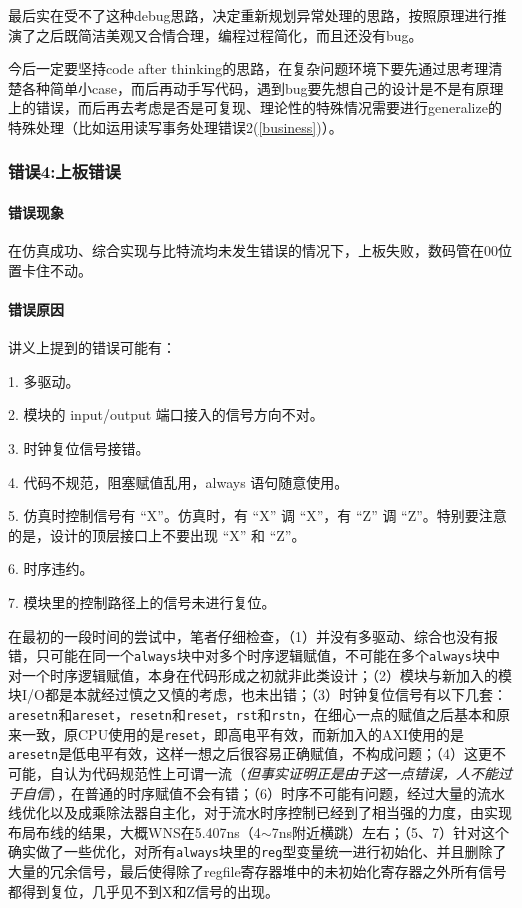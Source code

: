 \documentclass[UTF-8,twoside,c5size]{ctexart}
\begin{document}
	最后实在受不了这种debug思路，决定重新规划异常处理的思路，按照原理进行推演了之后既简洁美观又合情合理，编程过程简化，而且还没有bug。
	
	今后一定要坚持code after thinking的思路，在复杂问题环境下要先通过思考理清楚各种简单小case，而后再动手写代码，遇到bug要先想自己的设计是不是有原理上的错误，而后再去考虑是否是可复现、理论性的特殊情况需要进行generalize的特殊处理（比如运用读写事务处理错误2(\ref{business})）。
    	
   	\subsubsection{错误\textbf{4:}上板错误}
    	
    \paragraph{错误现象}\hfill
    
    在仿真成功、综合实现与比特流均未发生错误的情况下，上板失败，数码管在00位置卡住不动。
    
    \paragraph{错误原因}\hfill
    
    讲义上提到的错误可能有：
    
    1. 多驱动。
    
    2. 模块的 input/output 端口接入的信号方向不对。
    
    3. 时钟复位信号接错。
    
    4. 代码不规范，阻塞赋值乱用，always 语句随意使用。
    
    5. 仿真时控制信号有 “X”。仿真时，有 “X” 调 “X”，有 “Z” 调 “Z”。特别要注意的是，设计的顶层接口上不要出现 “X” 和 “Z”。
    
    6. 时序违约。
    
    7. 模块里的控制路径上的信号未进行复位。
    
    在最初的一段时间的尝试中，笔者仔细检查，（1）并没有多驱动、综合也没有报错，只可能在同一个\texttt{always}块中对多个时序逻辑赋值，不可能在多个\texttt{always}块中对一个时序逻辑赋值，本身在代码形成之初就非此类设计；（2）模块与新加入的模块I/O都是本就经过慎之又慎的考虑，也未出错；（3）时钟复位信号有以下几套：\texttt{aresetn}和\texttt{areset}，\texttt{resetn}和\texttt{reset}，\texttt{rst}和\texttt{rstn}，在细心一点的赋值之后基本和原来一致，原CPU使用的是\texttt{reset}，即高电平有效，而新加入的AXI使用的是\texttt{aresetn}是低电平有效，这样一想之后很容易正确赋值，不构成问题；（4）这更不可能，自认为代码规范性上可谓一流（\textsl{但事实证明正是由于这一点错误，人不能过于自信}），在普通的时序赋值不会有错；（6）时序不可能有问题，经过大量的流水线优化以及成乘除法器自主化，对于流水时序控制已经到了相当强的力度，由实现布局布线的结果，大概WNS在5.407ns（4$\sim$7ns附近横跳）左右；（5、7）针对这个确实做了一些优化，对所有\texttt{always}块里的\texttt{reg}型变量统一进行初始化、并且删除了大量的冗余信号，最后使得除了regfile寄存器堆中的未初始化寄存器之外所有信号都得到复位，几乎见不到X和Z信号的出现。
    
\end{document}
